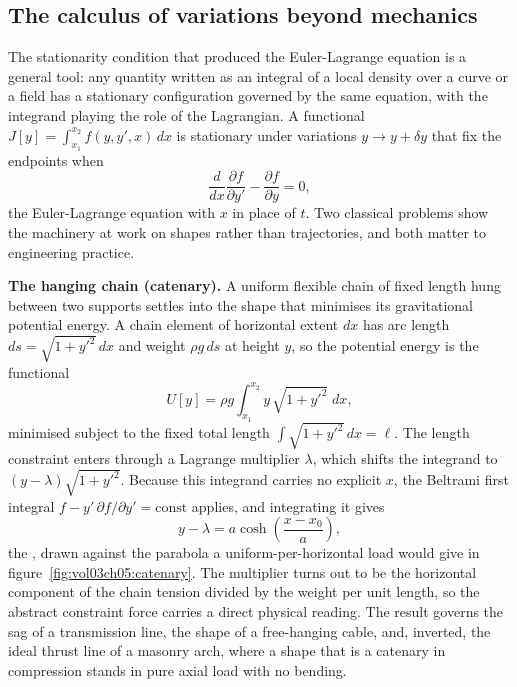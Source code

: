 \subsection{The calculus of variations beyond mechanics}

The stationarity condition that produced the Euler-Lagrange equation is a
general tool: any quantity written as an integral of a local density over a
curve or a field has a stationary configuration governed by the same
equation, with the integrand playing the role of the Lagrangian. A
functional $J[y] = \int_{x_1}^{x_2} f(y, y', x)\,dx$ is stationary under
variations $y\to y+\delta y$ that fix the endpoints when
\[
\frac{d}{dx}\frac{\partial f}{\partial y'} - \frac{\partial f}{\partial y}
= 0,
\]
the Euler-Lagrange equation with $x$ in place of $t$. Two classical problems
show the machinery at work on shapes rather than trajectories, and both
matter to engineering practice.

\textbf{The hanging chain (catenary).} A uniform flexible chain of fixed
length hung between two supports settles into the shape that minimises its
gravitational potential energy. A chain element of horizontal extent $dx$
has arc length $ds = \sqrt{1 + y'^2}\,dx$ and weight $\rho g\,ds$ at height
$y$, so the potential energy is the functional
\[
U[y] = \rho g\int_{x_1}^{x_2} y\,\sqrt{1 + y'^2}\;dx,
\]
minimised subject to the fixed total length $\int\sqrt{1+y'^2}\,dx = \ell$.
The length constraint enters through a Lagrange multiplier $\lambda$, which
shifts the integrand to $(y - \lambda)\sqrt{1 + y'^2}$. Because this
integrand carries no explicit $x$, the Beltrami first integral $f - y'\,
\partial f/\partial y' = \text{const}$ applies, and integrating it gives
\[
y - \lambda = a\cosh\!\left(\frac{x - x_0}{a}\right),
\]
the , drawn against the parabola a uniform-per-horizontal
load would give in figure~\ref{fig:vol03ch05:catenary}. The multiplier turns
out to be the horizontal component of the chain tension divided by the weight
per unit length, so the abstract constraint force carries a direct physical
reading. The result governs the sag of a transmission line, the shape of a
free-hanging cable, and, inverted, the ideal thrust line of a masonry arch,
where a shape that is a catenary in compression stands in pure axial load
with no bending.



